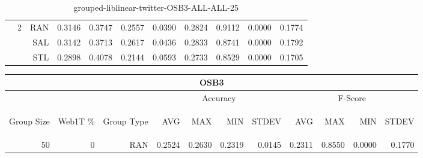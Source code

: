 \begin{center}
\begin{table}[htbp]
\begin{center}
\begin{tabular}{ | r | r | r | r | r | r | r | r | r | r | r |}
 & \multirow{3}{*}{2} & RAN & 0.3146 & 0.3747 & 0.2557 & 0.0390 & 0.2824 & 0.9112 & 0.0000 & 0.1774\\ \cline{3-11}
 &   & SAL & 0.3142 & 0.3713 & 0.2617 & 0.0436 & 0.2833 & 0.8741 & 0.0000 & 0.1792\\ \cline{3-11}
 &   & STL & 0.2898 & 0.4078 & 0.2144 & 0.0593 & 0.2733 & 0.8529 & 0.0000 & 0.1705\\ \cline{2-11}
\hline
\end{tabular}
\caption{grouped-liblinear-twitter-OSB3-ALL-ALL-25}
\end{center}
 \end{table}
\end{center}

\begin{center}
\begin{table}[htbp] 
 \begin{center}
\begin{tabular}{ | r | r | r | r | r | r | r | r | r | r | r |}
\hline
\multicolumn{11}{|c|}{OSB3}\\
\hline
 & & & \multicolumn{4}{|c|}{Accuracy} & \multicolumn{4}{|c|}{F-Score}\\ \cline{4-11}
\begin{sideways}Group Size\end{sideways} & \begin{sideways}Web1T \%\end{sideways} & \begin{sideways}Group Type\end{sideways} & \begin{sideways}AVG\end{sideways} & \begin{sideways}MAX\end{sideways} & \begin{sideways}MIN\end{sideways} & \begin{sideways}STDEV\end{sideways} & \begin{sideways}AVG\end{sideways} & \begin{sideways}MAX\end{sideways} & \begin{sideways}MIN\end{sideways} & \begin{sideways}STDEV\end{sideways}\\
\hline
\multirow{6}{*}{50}
 & \multirow{3}{*}{0} & RAN & 0.2524 & 0.2630 & 0.2319 & 0.0145 & 0.2311 & 0.8550 & 0.0000 & 0.1770\\ \cline{3-11}

\end{tabular}
\end{center}
\end{table}
\end{center}
